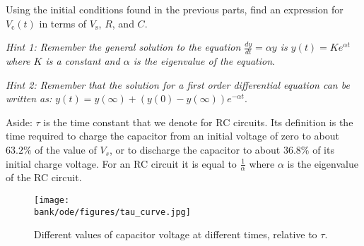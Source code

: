 \begin{enumerate}
\qitem Using the initial conditions found in the previous parts, find an expression for 
$V_{\text{c}}(t)$ in terms of $V_{\text{s}}$, $R$, and $C$.

\textit{Hint 1: Remember the general solution to the equation $\frac{dy}{dt}=\alpha y$ is 
$y(t)=Ke^{\alpha t}$ where $K$ is a constant and $\alpha$ is the eigenvalue of the equation}.

\textit{Hint 2: Remember that the solution for a first order differential equation 
can be written as: $y(t) = y(\infty) + (y(0) - y(\infty)) e^{-\alpha t}$}.


\end{enumerate}

Aside: $\tau$ is the time constant that we denote for RC circuits. 
Its definition is the time required to charge the capacitor from an initial voltage of zero to about $63.2\%$ of the value of $V_s$, 
or to discharge the capacitor to about $36.8\%$ of its initial charge voltage. For an RC circuit it is equal to $\frac{1}{\alpha}$ 
where $\alpha$ is the eigenvalue of the RC circuit.
\begin{figure}[!h]
  \centering
  \texttt{[image: \\bank/ode/figures/tau\_curve.jpg]}
  \caption{Different values of capacitor voltage at different times, relative to $\tau.$}
  \label{fig:Tau Curve for Charging RC Circuit}
\end{figure}

